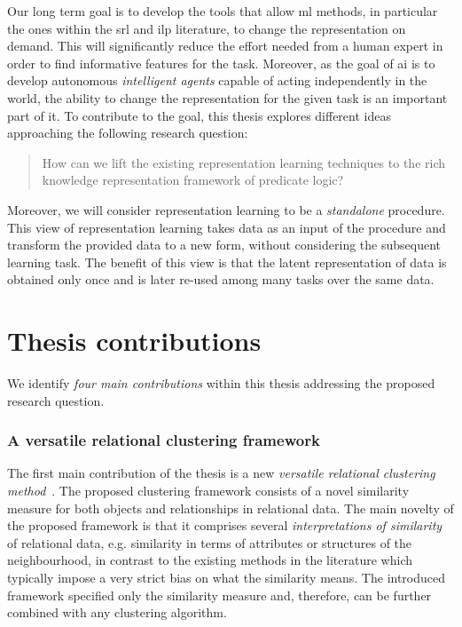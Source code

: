 Our long term goal is to develop the tools that allow \gls{ml} methods, in particular the ones within the \gls{srl} and \gls{ilp} literature, to change the representation on demand.
This will significantly reduce the effort needed from a human expert in order to find informative features for the task.
Moreover, as the goal of \gls{ai} is to develop autonomous \textit{intelligent agents} \cite{Russell:2009:AIM:1671238} capable of acting independently in the world, the ability to change the representation for the given task is an important part of it.
To contribute to the goal, this thesis explores different ideas approaching the following research question:

\begin{quote}
	How can we lift the existing representation learning techniques to the rich knowledge representation framework of predicate logic?
\end{quote}


Moreover, we will consider representation learning to be a \textit{standalone} procedure.
This view of representation learning takes data as an input of the procedure and transform the provided data to a new form, without considering the subsequent learning task.
The benefit of this view is that the latent representation of data is obtained only once and is later re-used among many tasks over the same data.







\section{Thesis contributions}




We identify \textit{four main contributions} within this thesis addressing the proposed research question.



\subsubsection{A versatile relational clustering framework}

The first main contribution of the thesis is a new \textit{versatile relational clustering method}~\cite{Dumancic2017a}.
The proposed clustering framework consists of a novel similarity measure for both objects and relationships in relational data.
The main novelty of the proposed framework is that it comprises several \textit{interpretations of similarity} of relational data, e.g. similarity in terms of attributes or structures of the neighbourhood, in contrast to the existing methods in the literature which typically impose a very strict bias on what the similarity means.
The introduced framework specified only the similarity measure and, therefore, can be further combined with any clustering algorithm.




